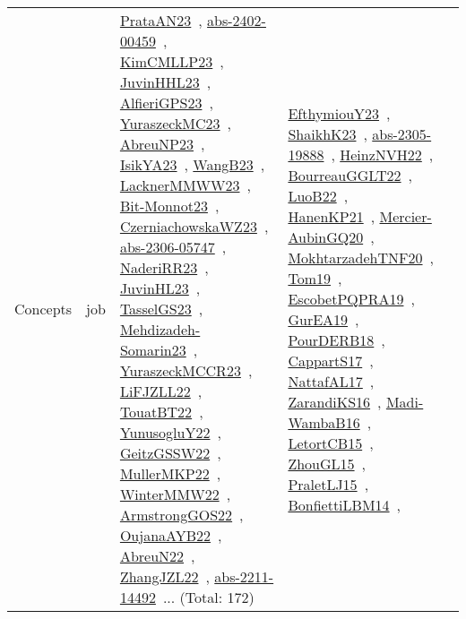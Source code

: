 {\begin{longtable}{lp{3cm}>{\raggedright\arraybackslash}p{6cm}>{\raggedright\arraybackslash}p{6cm}>{\raggedright\arraybackslash}p{8cm}}
Concepts & job & \href{works/PrataAN23.pdf}{PrataAN23}~\cite{PrataAN23}, \href{works/abs-2402-00459.pdf}{abs-2402-00459}~\cite{abs-2402-00459}, \href{works/KimCMLLP23.pdf}{KimCMLLP23}~\cite{KimCMLLP23}, \href{works/JuvinHHL23.pdf}{JuvinHHL23}~\cite{JuvinHHL23}, \href{works/AlfieriGPS23.pdf}{AlfieriGPS23}~\cite{AlfieriGPS23}, \href{works/YuraszeckMC23.pdf}{YuraszeckMC23}~\cite{YuraszeckMC23}, \href{works/AbreuNP23.pdf}{AbreuNP23}~\cite{AbreuNP23}, \href{works/IsikYA23.pdf}{IsikYA23}~\cite{IsikYA23}, \href{works/WangB23.pdf}{WangB23}~\cite{WangB23}, \href{works/LacknerMMWW23.pdf}{LacknerMMWW23}~\cite{LacknerMMWW23}, \href{works/Bit-Monnot23.pdf}{Bit-Monnot23}~\cite{Bit-Monnot23}, \href{works/CzerniachowskaWZ23.pdf}{CzerniachowskaWZ23}~\cite{CzerniachowskaWZ23}, \href{works/abs-2306-05747.pdf}{abs-2306-05747}~\cite{abs-2306-05747}, \href{works/NaderiRR23.pdf}{NaderiRR23}~\cite{NaderiRR23}, \href{works/JuvinHL23.pdf}{JuvinHL23}~\cite{JuvinHL23}, \href{works/TasselGS23.pdf}{TasselGS23}~\cite{TasselGS23}, \href{works/Mehdizadeh-Somarin23.pdf}{Mehdizadeh-Somarin23}~\cite{Mehdizadeh-Somarin23}, \href{works/YuraszeckMCCR23.pdf}{YuraszeckMCCR23}~\cite{YuraszeckMCCR23}, \href{works/LiFJZLL22.pdf}{LiFJZLL22}~\cite{LiFJZLL22}, \href{works/TouatBT22.pdf}{TouatBT22}~\cite{TouatBT22}, \href{works/YunusogluY22.pdf}{YunusogluY22}~\cite{YunusogluY22}, \href{works/GeitzGSSW22.pdf}{GeitzGSSW22}~\cite{GeitzGSSW22}, \href{works/MullerMKP22.pdf}{MullerMKP22}~\cite{MullerMKP22}, \href{works/WinterMMW22.pdf}{WinterMMW22}~\cite{WinterMMW22}, \href{works/ArmstrongGOS22.pdf}{ArmstrongGOS22}~\cite{ArmstrongGOS22}, \href{works/OujanaAYB22.pdf}{OujanaAYB22}~\cite{OujanaAYB22}, \href{works/AbreuN22.pdf}{AbreuN22}~\cite{AbreuN22}, \href{works/ZhangJZL22.pdf}{ZhangJZL22}~\cite{ZhangJZL22}, \href{works/abs-2211-14492.pdf}{abs-2211-14492}~\cite{abs-2211-14492}... (Total: 172) & \href{works/EfthymiouY23.pdf}{EfthymiouY23}~\cite{EfthymiouY23}, \href{works/ShaikhK23.pdf}{ShaikhK23}~\cite{ShaikhK23}, \href{works/abs-2305-19888.pdf}{abs-2305-19888}~\cite{abs-2305-19888}, \href{works/HeinzNVH22.pdf}{HeinzNVH22}~\cite{HeinzNVH22}, \href{works/BourreauGGLT22.pdf}{BourreauGGLT22}~\cite{BourreauGGLT22}, \href{works/LuoB22.pdf}{LuoB22}~\cite{LuoB22}, \href{works/HanenKP21.pdf}{HanenKP21}~\cite{HanenKP21}, \href{works/Mercier-AubinGQ20.pdf}{Mercier-AubinGQ20}~\cite{Mercier-AubinGQ20}, \href{works/MokhtarzadehTNF20.pdf}{MokhtarzadehTNF20}~\cite{MokhtarzadehTNF20}, \href{works/Tom19.pdf}{Tom19}~\cite{Tom19}, \href{works/EscobetPQPRA19.pdf}{EscobetPQPRA19}~\cite{EscobetPQPRA19}, \href{works/GurEA19.pdf}{GurEA19}~\cite{GurEA19}, \href{works/PourDERB18.pdf}{PourDERB18}~\cite{PourDERB18}, \href{works/CappartS17.pdf}{CappartS17}~\cite{CappartS17}, \href{works/NattafAL17.pdf}{NattafAL17}~\cite{NattafAL17}, \href{works/ZarandiKS16.pdf}{ZarandiKS16}~\cite{ZarandiKS16}, \href{works/Madi-WambaB16.pdf}{Madi-WambaB16}~\cite{Madi-WambaB16}, \href{works/LetortCB15.pdf}{LetortCB15}~\cite{LetortCB15}, \href{works/ZhouGL15.pdf}{ZhouGL15}~\cite{ZhouGL15}, \href{works/PraletLJ15.pdf}{PraletLJ15}~\cite{PraletLJ15}, \href{works/BonfiettiLBM14.pdf}{BonfiettiLBM14}~\cite{BonfiettiLBM14}, 
\end{longtable}}
